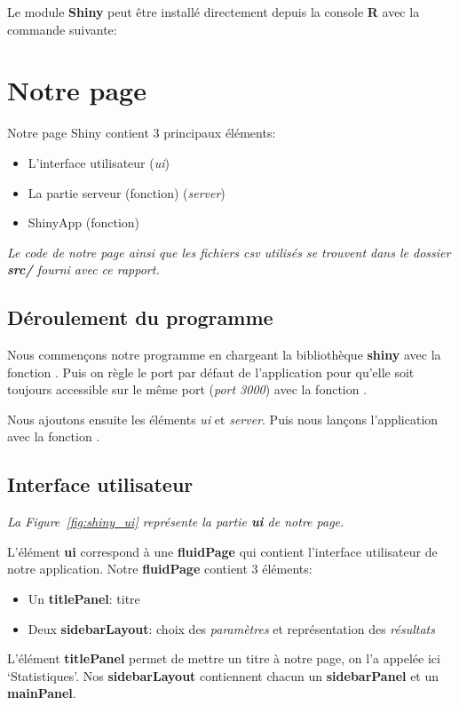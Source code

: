 \documentclass[12pt, a4paper]{article}
\begin{document}
\noindent Le module \textbf{Shiny} peut être installé directement depuis la console \textbf{R} avec la commande suivante:
\begin{center}
\end{center}

\section{Notre page}

\noindent Notre page Shiny contient 3 principaux éléments:
\begin{itemize}
    \item L'interface utilisateur (\textit{ui})
    \item La partie serveur (fonction) (\textit{server})
    \item ShinyApp (fonction)
\end{itemize}
\bigskip
\textit{Le code de notre page ainsi que les fichiers csv utilisés se trouvent dans le dossier \textbf{src/} fourni avec ce rapport.}

\subsection*{Déroulement du programme}
\label{subsec:deroulement}

Nous commençons notre programme en chargeant la bibliothèque \textbf{shiny} avec la fonction .
Puis on règle le port par défaut de l'application pour qu'elle soit toujours accessible sur le même port (\textit{port 3000})
avec la fonction .
\bigskip

Nous ajoutons ensuite les éléments \textit{ui} et \textit{server}.
Puis nous lançons l'application avec la fonction .

\subsection*{Interface utilisateur}

\noindent \textit{La Figure~\ref{fig:shiny_ui} représente la partie \textbf{ui} de notre page.}
\bigskip

L'élément \textbf{ui} correspond à une \textbf{fluidPage} qui contient l'interface utilisateur de notre application.
Notre \textbf{fluidPage} contient 3 éléments:
\begin{itemize}
    \item Un \textbf{titlePanel}: titre
    \item Deux \textbf{sidebarLayout}: choix des \textit{paramètres} et représentation des \textit{résultats}
\end{itemize}
L'élément \textbf{titlePanel} permet de mettre un titre à notre page, on l'a appelée ici `Statistiques'.
Nos \textbf{sidebarLayout} contiennent chacun un \textbf{sidebarPanel} et un \textbf{mainPanel}.
\bigskip
\end{document}
